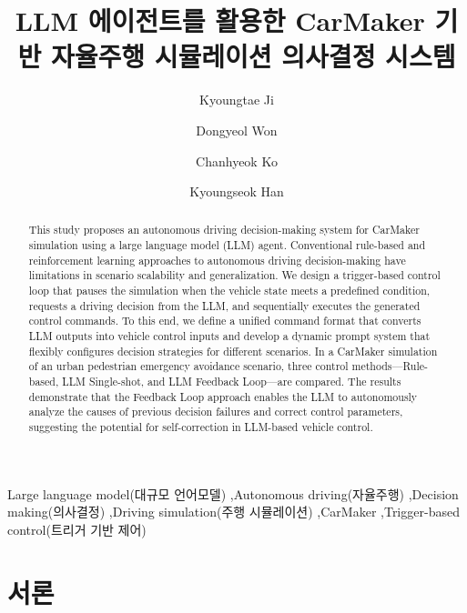 \documentclass[final,5p,times,twocolumn,9pt]{elsarticle}
\begin{document}
\begin{frontmatter}


\title{LLM 에이전트를 활용한 CarMaker 기반 자율주행 시뮬레이션 의사결정 시스템}


\author[1]{Kyoungtae Ji}
\author[1]{Dongyeol Won}
\author[1]{Chanhyeok Ko}
\author[1]{Kyoungseok Han}


\begin{abstract}
This study proposes an autonomous driving decision-making system for CarMaker simulation using a large language model (LLM) agent. Conventional rule-based and reinforcement learning approaches to autonomous driving decision-making have limitations in scenario scalability and generalization. We design a trigger-based control loop that pauses the simulation when the vehicle state meets a predefined condition, requests a driving decision from the LLM, and sequentially executes the generated control commands. To this end, we define a unified command format that converts LLM outputs into vehicle control inputs and develop a dynamic prompt system that flexibly configures decision strategies for different scenarios. In a CarMaker simulation of an urban pedestrian emergency avoidance scenario, three control methods---Rule-based, LLM Single-shot, and LLM Feedback Loop---are compared. The results demonstrate that the Feedback Loop approach enables the LLM to autonomously analyze the causes of previous decision failures and correct control parameters, suggesting the potential for self-correction in LLM-based vehicle control.
\end{abstract}


\begin{keyword}
Large language model(대규모 언어모델) \sep Autonomous driving(자율주행) \sep Decision making(의사결정) \sep Driving simulation(주행 시뮬레이션) \sep CarMaker \sep Trigger-based control(트리거 기반 제어)
\end{keyword}

\end{frontmatter}


\section{서론}
\label{sec:introduction}
\end{document}
